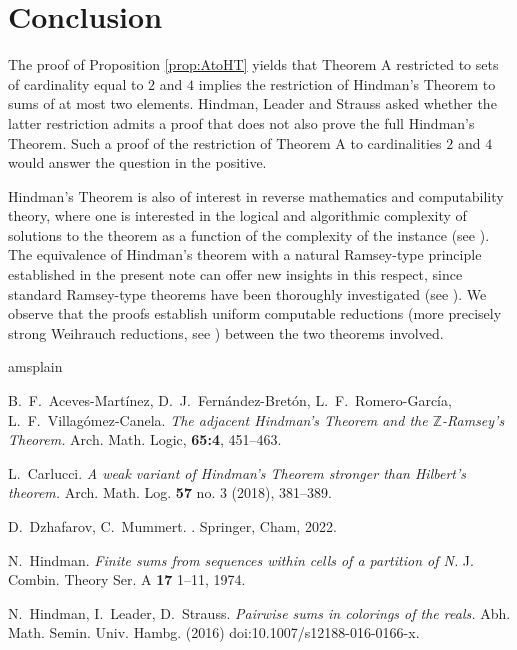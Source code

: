 \documentclass[10pt,a4paper]{amsart}
\theoremstyle{definition}
\begin{document}
\section{Conclusion}

The proof of Proposition \ref{prop:AtoHT} yields that Theorem A restricted to sets of cardinality equal to $2$ and $4$ implies 
the restriction of Hindman's Theorem to sums of at most two elements. Hindman, Leader and Strauss \cite{HLS:16} asked whether
the latter restriction admits a proof that does not also prove the full Hindman's Theorem. Such a proof of the 
restriction of Theorem A to cardinalities $2$ and $4$ would answer the question in the positive. 

Hindman's Theorem is also of interest in reverse mathematics and computability theory, 
where one is interested in the logical and algorithmic complexity of solutions to the theorem as a function of the complexity of the instance 
(see \cite[Section 9.9]{Dza-Mum:22}). The equivalence of Hindman's theorem with a natural Ramsey-type principle established in the present note can offer new insights in this respect, since standard Ramsey-type theorems have been thoroughly investigated (see \cite[Chapter 8]{Dza-Mum:22}). We observe that the proofs establish uniform computable reductions (more precisely strong Weihrauch reductions, see \cite{Dza-Mum:22}) between the two theorems involved.

\begin{thebibliography}{amsplain}

B.~F.~Aceves-Martínez, D.~J.~Fernández-Bretón, L.~F.~Romero-García, L.~F.~Villagómez-Canela.
{\em The adjacent Hindman’s Theorem and the $\mathbb{Z}$-Ramsey’s Theorem.}
Arch. Math. Logic, {\bf 65:4}, 451--463.


L.~Carlucci.
{\em A weak variant of Hindman's Theorem stronger than Hilbert's theorem.} 
Arch. Math. Log. {\bf 57} no. 3 (2018), 381--389.


\newblock D.~Dzhafarov, C.~Mummert.
. 
\newblock Springer, Cham, 2022. 



N.~Hindman. 
{\em Finite sums from sequences within cells of a partition of N.}
J. Combin. Theory Ser. A
{\bf 17} 1--11, 1974.

N.~Hindman, I.~Leader, D.~Strauss.
{\em Pairwise sums in colorings of the reals.}
Abh. Math. Semin. Univ. Hambg. (2016)
doi:10.1007/s12188-016-0166-x. 

\end{thebibliography}
\end{document}
